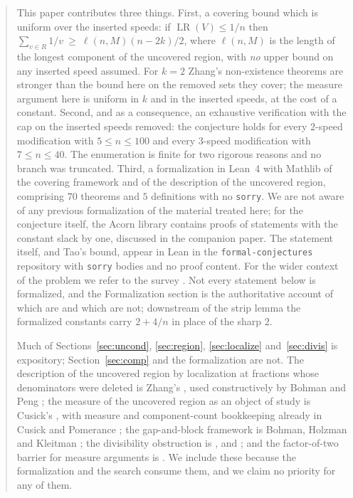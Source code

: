 \documentclass[11pt]{amsart}
\theoremstyle{plain}
\theoremstyle{definition}
\newcommand{\LR}{\operatorname{LR}}
\begin{document}
\begin{abstract}
This paper contributes three things. First, a covering bound which is uniform over the inserted
speeds: if $\LR(V)\le1/n$ then $\sum_{v\in R}1/v\ \ge\ \ell(n,M)(n-2k)/2$, where $\ell(n,M)$ is the
length of the longest component of the uncovered region, with \emph{no} upper bound on any inserted
speed assumed. For $k=2$ Zhang's non-existence theorems \cite[Thms.~7.5, 7.10]{zhang} are stronger than the bound
here on the removed sets they cover; the measure argument here is uniform in $k$ and in the inserted
speeds, at the cost of a constant. Second, and as a
consequence, an exhaustive verification with the cap on the inserted speeds removed: the conjecture
holds for every $2$-speed modification with $5\le n\le100$ and every $3$-speed modification with
$7\le n\le40$. The enumeration is finite for two rigorous reasons and no branch was truncated.
Third, a formalization in Lean~4 with Mathlib of the covering framework and of the description of
the uncovered region, comprising $70$ theorems and $5$ definitions with no \texttt{sorry}. We are not aware of any
previous formalization of the material treated here; for the conjecture itself, the Acorn library
contains proofs of statements with the constant slack by one, discussed in the companion paper. The statement itself, and Tao's
bound, appear in Lean in the \texttt{formal-conjectures} repository with \texttt{sorry} bodies and
no proof content. For the wider context of the problem we refer to the survey \cite{ps}. Not every statement below is
formalized, and the Formalization section is the authoritative account of which are and which are
not; downstream of the strip lemma the formalized constants carry $2+4/n$ in place of the sharp $2$.

Much of Sections~\ref{sec:uncond}, \ref{sec:region}, \ref{sec:localize} and~\ref{sec:divis} is
expository; Section~\ref{sec:comp} and the formalization are not. The description of the uncovered region
by localization at fractions whose denominators were deleted is Zhang's \cite[\S2, proof of Lemma~2.4]{zhang}, used
constructively by Bohman and Peng \cite[\S3]{bp}; the measure of the uncovered region as an object of
study is Cusick's \cite{cusick74}, with measure and component-count bookkeeping already in
Cusick and Pomerance \cite{cp}; the gap-and-block framework is Bohman, Holzman and Kleitman
\cite{bhk}; the divisibility obstruction is \cite[Lemma~2.2]{gw}, \cite[Lemmas~2.3, 6.1]{zhang} and
\cite[Lemma~4]{rosenfeld}; and the factor-of-two barrier for measure arguments is \cite[Prop.~1.1]{tao}.
We include these because the formalization and the search consume them, and we claim no priority for
any of them.
\end{abstract}
\end{document}

